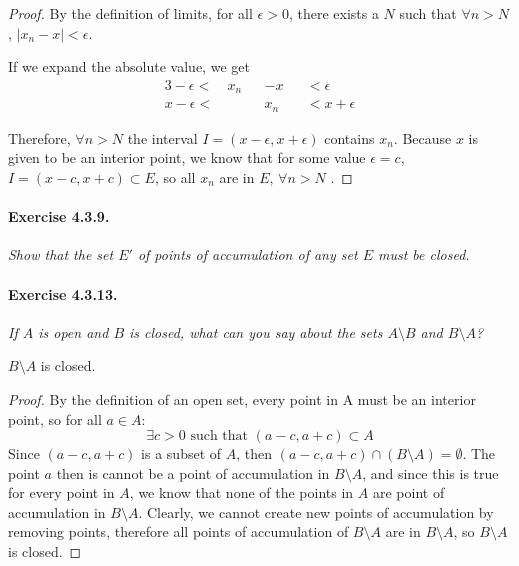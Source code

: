 \documentclass[11pt]{article}
\def \xn {x_n}
\begin{document}
\begin{proof}
	By the definition of limits, for all $\epsilon > 0$, there exists a $N$ such that $\forall n > N$, $|x_n - x| < \epsilon$. 
	
	If we expand the absolute value, we get 
	\begin{alignat*}{3}
		-\epsilon <\ &x_n &&- x &&< \epsilon \\
		x - \epsilon < & &&x_n  &&< x + \epsilon
	\end{alignat*}
	
	Therefore, $\forall n > N$ the interval $I = (x - \epsilon, x + \epsilon)$ contains $x_n$. Because $x$ is given to be an interior point, we know that for some value $\epsilon = c$, $I = (x - c, x + c) \subset E$, so all $x_n$ are in $E$, $\forall n > N$ . 
	
\end{proof}

 
\paragraph{Exercise 4.3.9.} \textit{Show that the set $E'$ of points of accumulation of any set $E$ must be closed.}



\def \AB {A \setminus B} 
\def \BA {B \setminus A} 
\def \poa {point of accumulation}
\paragraph{Exercise 4.3.13.} \textit{If $A$ is open and $B$ is closed, what can you say about the sets $\AB$ and $\BA$?} \newline

$\BA$ is closed.
\begin{proof}
By the definition of an open set, every point in A must be an interior point, so for all $a \in A$: $$\exists c > 0 \text{ such that } (a - c, a + c) \subset A$$ Since $(a - c, a + c)$ is a subset of $A$, then $(a - c, a + c) \cap (\BA) = \emptyset$. The point $a$ then is cannot be a {\poa} in $\BA$, and since this is true for every point in $A$, we know that none of the points in $A$ are point of accumulation in $\BA$. Clearly, we cannot create new points of accumulation by removing points, therefore all points of accumulation of $\BA$ are in $\BA$, so $\BA$ is closed.
\end{proof}


\def \setxn {\{\xn\}}
\def \xnk {x_{n_k}}
\def \setxnk {\{\xnk\}}
\end{document}
